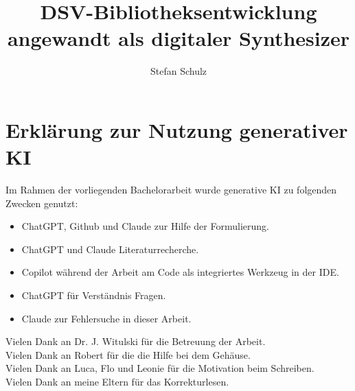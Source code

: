 \documentclass{hhuthesis}
\author{Stefan Schulz}
\title{DSV-Bibliotheksentwicklung angewandt als digitaler Synthesizer}
\begin{document}
\frontmatter
\makefrontmatter

\section*{Erklärung zur Nutzung generativer KI}

Im Rahmen der vorliegenden Bachelorarbeit wurde generative KI zu folgenden Zwecken genutzt:


\begin{itemize}
    \item ChatGPT, Github und Claude zur Hilfe der Formulierung.
    \item ChatGPT und Claude Literaturrecherche.
    \item Copilot während der Arbeit am Code als integriertes Werkzeug in der IDE.
    \item ChatGPT für Verständnis Fragen.
    \item Claude zur Fehlersuche in dieser Arbeit.
\end{itemize}

\begin{acknowledgements}
  Vielen Dank an Dr. J. Witulski für die Betreuung der Arbeit.\\
  Vielen Dank an Robert für die die Hilfe bei dem Gehäuse.\\
  Vielen Dank an Luca, Flo und Leonie für die Motivation beim Schreiben.\\
  Vielen Dank an meine Eltern für das Korrekturlesen. 
\end{acknowledgements}


\tableofcontents


\mainmatter

\end{document}
